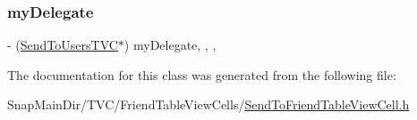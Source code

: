 \hypertarget{interface_send_to_friend_table_view_cell_a8371ead0bafd6fae72171056eeb4e184}{}\label{interface_send_to_friend_table_view_cell_a8371ead0bafd6fae72171056eeb4e184} 
\subsubsection{\texorpdfstring{my\+Delegate}{myDelegate}}
{\footnotesize\ttfamily -\/ (\hyperlink{interface_send_to_users_t_v_c}{Send\+To\+Users\+T\+VC}$\ast$) my\+Delegate\hspace{0.3cm}{\ttfamily [read]}, {\ttfamily [write]}, {\ttfamily [nonatomic]}, {\ttfamily [weak]}}



The documentation for this class was generated from the following file\+:\begin{DoxyCompactItemize}
\item 
Snap\+Main\+Dir/\+T\+V\+C/\+Friend\+Table\+View\+Cells/\hyperlink{_send_to_friend_table_view_cell_8h}{Send\+To\+Friend\+Table\+View\+Cell.\+h}\end{DoxyCompactItemize}
